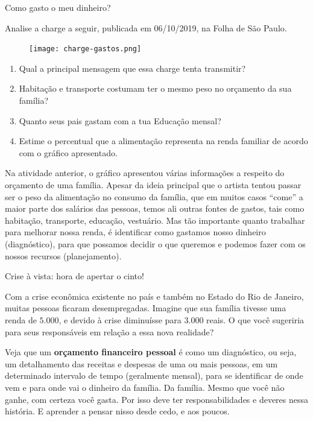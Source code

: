\begin{task}{Como gasto o meu dinheiro?}
\label{fin-ativ-6}

Analise a charge a seguir, publicada em 06/10/2019, na Folha de São Paulo.

\begin{figure}[H]
\centering
\texttt{[image: charge-gastos.png]}

\end{figure}

\begin{enumerate}
\item Qual a principal mensagem que essa charge tenta transmitir?
\item Habitação e transporte costumam ter o mesmo peso no orçamento da sua família?
\item Quanto seus pais gastam com a tua Educação mensal?
\item Estime o percentual que a alimentação representa na renda familiar de acordo com o gráfico apresentado.

\end{enumerate}
\end{task}

Na atividade anterior, o gráfico apresentou várias informações a respeito do orçamento de uma família. Apesar da ideia principal que o artista tentou passar ser o peso da alimentação no consumo da família, que em muitos casos “come” a maior parte dos salários das pessoas, temos ali outras fontes de gastos, tais como habitação, transporte, educação, vestuário. Mas tão importante quanto trabalhar para melhorar nossa renda, é identificar como gastamos nosso dinheiro (diagnóstico), para que possamos decidir o que queremos e podemos fazer com os nossos recursos (planejamento). 


\begin{task}{Crise à vista: hora de apertar o cinto!}
\label{fin-ativ-7}

Com a crise econômica existente no país e também no Estado do Rio de Janeiro, muitas pessoas ficaram desempregadas. Imagine que sua família tivesse uma renda de $5.000$, e devido à crise diminuísse para $3.000$ reais. O que você sugeriria para seus responsáveis em relação a essa nova realidade?
\end{task}

\label{fin-arg-2}

Veja que um \textbf{orçamento financeiro pessoal} é como um diagnóstico, ou seja, um detalhamento das receitas e despesas de uma ou mais pessoas, em um determinado intervalo de tempo (geralmente mensal), para se identificar de onde vem e para onde vai o dinheiro da família. Da família. Mesmo que você não ganhe, com certeza você gasta. Por isso deve ter responsabilidades e deveres nessa história. E aprender a pensar nisso desde cedo, e aos poucos.

